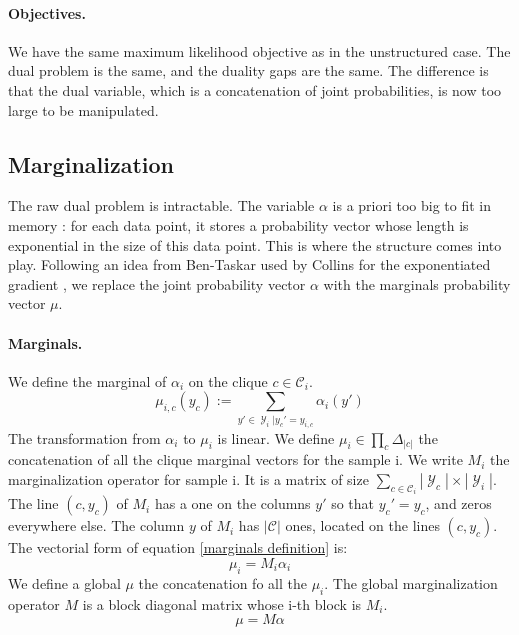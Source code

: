 \documentclass{article}
\DeclareMathOperator{\1}{\mathbb{1}}
\DeclareMathOperator{\Y}{\mathcal{Y}}
\begin{document}
\paragraph{Objectives.}
We have the same maximum likelihood objective as in the unstructured case.
The dual problem is the same, and the duality gaps are the same.
The difference is that the dual variable, which is a concatenation of joint probabilities, is now too large to be manipulated.

\subsection{Marginalization}
The raw dual problem is intractable.
The variable $\alpha$ is a priori too big to fit in memory : for each data point, it stores a probability vector whose length is exponential in the size of this data point.
This is where the structure comes into play.
Following an idea from Ben-Taskar \cite{taskar_max-margin_2004} used by Collins for the exponentiated gradient \cite{collins_exponentiated_2008}, we replace the joint probability vector $\alpha$ with the marginals probability vector $\mu$.

\paragraph{Marginals.}
We define the marginal of $\alpha_i$ on the clique $c \in \mathcal C_i$.
\begin{equation}
	\label{marginals definition}
	\mu_{i, c}(y_c) := \sum_{y'\in \Y_i | y_c' = y_{i, c}} \alpha_i(y')
\end{equation}
The transformation from $\alpha_i$ to $\mu_i$ is linear.
We define $\mu_i \in \prod_c \Delta_|c|$ the concatenation of all the clique marginal vectors for the sample i.
We write $M_i$ the marginalization operator for sample i.
It is a matrix of size $\sum_{c \in \mathcal C_i} |\Y_c| \times |\Y_i |$.
The line $(c, y_c)$ of $M_i$ has a one on the columns $y'$ so that $y_c'=y_c$, and zeros everywhere else.
The column $y$ of $M_i$ has $|\mathcal C|$ ones, located on the lines $(c, y_c)$.
The vectorial form of equation \ref{marginals definition} is:
\begin{equation*}
	\mu_i = M_i \alpha_i
\end{equation*}
We define a global $\mu$ the concatenation fo all the $\mu_i$.
The global marginalization operator $M$ is a block diagonal matrix whose i-th block is $M_i$.
\begin{equation}
	\label{marginals vectorial}
	\mu = M \alpha
\end{equation} 
\end{document}
